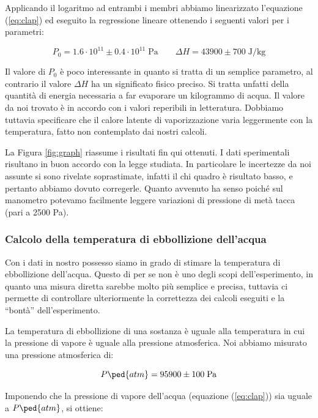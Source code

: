 Applicando il logaritmo ad entrambi i membri abbiamo linearizzato l'equazione (\ref{eq:clap}) ed eseguito la regressione lineare ottenendo i seguenti valori per i parametri:

\begin{equation}
    P_0 = 1.6 \cdot 10^{11} \pm 0.4 \cdot 10^{11} \; \si{\pascal} \qquad \Delta H = 43900 \pm  700 \; \si{\joule\per\kilo\gram} 
\end{equation}

Il valore di $P_0$ è poco interessante in quanto si tratta di un semplice parametro, al contrario il valore
$\Delta H$ ha un significato fisico preciso. Si tratta unfatti della quantità di energia necessaria a far evaporare un kilogrammo
di acqua. Il valore da noi trovato è in accordo con i valori reperibili in letteratura. Dobbiamo tuttavia specificare che il calore latente di vaporizzazione varia leggermente con la temperatura,
fatto non contemplato dai nostri calcoli.

La Figura \ref{fig:graph} riassume i risultati fin qui ottenuti. I dati sperimentali risultano in buon accordo
con la legge studiata. In particolare le incertezze da noi assunte si sono rivelate soprastimate, infatti
il chi quadro è risultato basso, e pertanto abbiamo dovuto corregerle. Quanto avvenuto ha senso poiché sul manometro potevamo facilmente
leggere variazioni di pressione di metà tacca (pari a 2500 \si{\pascal}).


\subsubsection{Calcolo della temperatura di ebbollizione dell'acqua}

Con i dati in nostro possesso siamo in grado di stimare la temperatura di ebbollizione dell'acqua.
Questo di per se non è uno degli scopi dell'esperimento, in quanto una misura diretta sarebbe molto
più semplice e precisa, tuttavia ci permette di controllare ulteriormente la correttezza dei calcoli
eseguiti e la ``bontà'' dell'esperimento.

La temperatura di ebbollizione di una sostanza è uguale alla temperatura in cui la pressione di vapore
è uguale alla pressione atmosferica. Noi abbiamo misurato una pressione atmosferica di:

\begin{equation}
    P\ped{atm} =  95900 \pm 100 \; \si{\pascal}
\end{equation}

Imponendo che la pressione di vapore dell'acqua (equazione (\ref{eq:clap})) sia uguale a $P\ped{atm}$, si ottiene:

